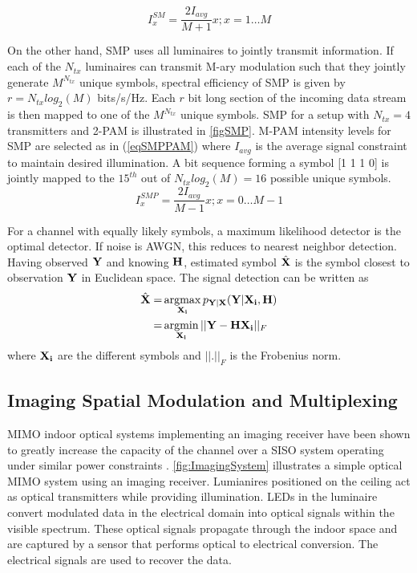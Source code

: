\begin{equation}
	\label{eqSMPAM}
	I_{x}^{SM} = \frac{2I_{avg}}{M+1}x; x=1\hdots M
\end{equation}

On the other hand, SMP uses all luminaires to jointly transmit information. If each of the $N_{tx}$ luminaires can transmit M-ary modulation such that they jointly generate $M^{N_{tx}}$ unique symbols, spectral efficiency of SMP is given by $r=N_{tx}log_2(M)$ bits/s/Hz. Each $r$ bit long section of the incoming data stream is then mapped to one of the $M^{N_{tx}}$ unique symbols. SMP for a setup with $N_{tx}=4$ transmitters and 2-PAM is illustrated in \figurename{ \ref{figSMP}}. M-PAM intensity levels for SMP are selected as in (\ref{eqSMPPAM}) where $I_{avg}$ is the average signal constraint to maintain desired illumination. A bit sequence forming a symbol [1 1 1 0] is jointly mapped to the $15^{th}$ out of $N_{tx}log_2(M)=16$ possible unique symbols.
\begin{equation}
	\label{eqSMPPAM}
	I_{x}^{SMP} = \frac{2I_{avg}}{M-1}x; x=0\hdots M-1
\end{equation}

For a channel with equally likely symbols, a maximum likelihood detector is the optimal detector. If noise is AWGN, this reduces to nearest neighbor detection. Having observed ${\bf{Y}}$ and knowing ${\bf{H}}$, estimated symbol $\hat{{\bf{X}}}$ is the symbol closest to observation ${\bf{Y}}$ in Euclidean space. The signal detection can be written as
\begin{gather}
\begin{aligned}
	\hat{{\bf{X}}} =&{} \argmax_{{\bf{X_i}}} p_{{\bf{Y}}|{\bf{X}}}({\bf{Y}}|{\bf{X_i}},{\bf{H}})\\
	=&{} \argmin_{{\bf{X_i}}} ||{\bf{Y}}-{\bf{H}}{\bf{X_i}}||_{F}
\label{eq:ML}
\end{aligned}
\end{gather}
where ${\bf{X_i}}$ are the different symbols and $||.||_{F}$ is the Frobenius norm.


\subsection{Imaging Spatial Modulation and Multiplexing}
\label{subsec:osmImaging}
MIMO indoor optical systems implementing an imaging receiver have been
shown to greatly increase the capacity of the channel over a SISO
system operating under similar power constraints
\cite{but13a}. \figurename{\ref{fig:ImagingSystem}} illustrates a
simple optical MIMO system using an imaging receiver. Lumianires
positioned on the ceiling act as optical transmitters while providing
illumination. LEDs in the luminaire convert modulated data in the
electrical domain into optical signals within the visible
spectrum. These optical signals propagate through the indoor space and
are captured by a sensor that performs optical to electrical
conversion. The electrical signals are used to recover the data.

